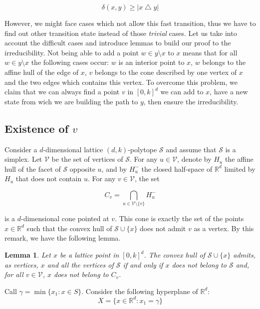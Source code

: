 \documentclass[a4paper]{article}
\newtheorem{lemma}{Lemma}[subsection]
\renewcommand{\S}{\mathcal{S}}
\begin{document}
\begin{equation}  \delta(x,y) \geq{|x \bigtriangleup y|}
\end{equation}

However, we might face cases which not allow this fast transition, thus we have to find out other transition state instead of those \textit{trivial} cases. Let us take into account the difficult cases and introduce lemmas to build our proof to the irreducibility. Not being able to add a point $w \in y \setminus x$ to $x$ means that for all $w \in y \setminus x$ the following cases occur: $w$ is an interior point to $x$, $w$ belongs to the affine hull of the edge of $x$, $v$ belongs to the cone described by one vertex of $x$ and the two edges which contains this vertex. To overcome this problem, we claim that we can always find a point $v$ in $[0,k]^d$ we can add to $x$, have a new state from wich we are building the path to $y$, then ensure the irreducibility.

\subsection{Existence of $v$}

Consider a $d$-dimensional lattice $(d,k)$-polytope $\S$ and assume that $\S$ is a simplex. Let $\mathcal{V}$ be the set of vertices of $\S$. For any $u\in\mathcal{V}$, denote by $H_u$ the affine hull of the facet of $\S$ opposite $u$, and by $H_u^-$ the closed half-space of $\mathbb{R}^d$ limited by $H_u$ that does not contain $u$.
For any $v\in\mathcal{V}$, the set

\begin{equation}
  C_v=\bigcap_{u\in\mathcal{V}\mathord{\setminus}\{v\}}H_u^-
\end{equation}

is a $d$-dimensional cone pointed at $v$. This cone is exactly the set of the points $x\in\mathbb{R}^d$ such that the convex hull of $\S\cup\{x\}$ does not admit $v$ as a vertex. By this remark, we have the following lemma.

\begin{lemma}\label{Lem.A}
Let $x$ be a lattice point in $[0,k]^d$. The convex hull of $\S\cup\{x\}$ admits, as vertices, $x$ and all the vertices of $\S$ if and only if $x$ does not belong to $\S$ and, for all $v\in\mathcal{V}$, $x$ does not belong to $C_v$.
\end{lemma}

Call $\gamma=\min\{x_1:x\in{S}\}$. Consider the following hyperplane of $\mathbb{R}^d$:
$$
X=\{x\in\mathbb{R}^d:x_1=\gamma\}
$$
\end{document}
